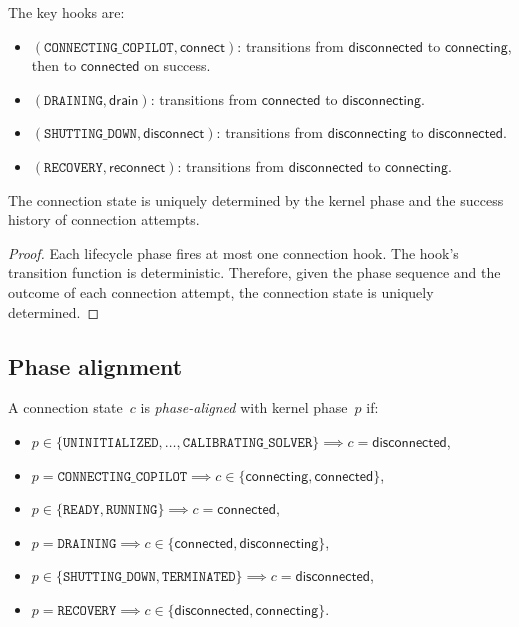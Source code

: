 \documentclass[11pt]{article}
\begin{document}
The key hooks are:
\begin{itemize}
\item $(\texttt{CONNECTING\_COPILOT}, \mathsf{connect})$:
      transitions from $\mathsf{disconnected}$ to
      $\mathsf{connecting}$, then to $\mathsf{connected}$
      on success.
\item $(\texttt{DRAINING}, \mathsf{drain})$: transitions from
      $\mathsf{connected}$ to $\mathsf{disconnecting}$.
\item $(\texttt{SHUTTING\_DOWN}, \mathsf{disconnect})$:
      transitions from $\mathsf{disconnecting}$ to
      $\mathsf{disconnected}$.
\item $(\texttt{RECOVERY}, \mathsf{reconnect})$: transitions
      from $\mathsf{disconnected}$ to $\mathsf{connecting}$.
\end{itemize}

\begin{lemma}\label{lem:conndet}
The connection state is uniquely determined by the kernel
phase and the success history of connection attempts.
\end{lemma}
\begin{proof}
Each lifecycle phase fires at most one connection hook.
The hook's transition function is deterministic.
Therefore, given the phase sequence and the outcome of
each connection attempt, the connection state is
uniquely determined.
\end{proof}

\subsection{Phase alignment}

\begin{definition}\label{def:phasealign}
A connection state~$c$ is \emph{phase-aligned} with
kernel phase~$p$ if:
\begin{itemize}
\item $p \in \{\texttt{UNINITIALIZED}, \ldots,
      \texttt{CALIBRATING\_SOLVER}\} \implies
      c = \mathsf{disconnected}$,
\item $p = \texttt{CONNECTING\_COPILOT} \implies
      c \in \{\mathsf{connecting}, \mathsf{connected}\}$,
\item $p \in \{\texttt{READY}, \texttt{RUNNING}\} \implies
      c = \mathsf{connected}$,
\item $p = \texttt{DRAINING} \implies
      c \in \{\mathsf{connected}, \mathsf{disconnecting}\}$,
\item $p \in \{\texttt{SHUTTING\_DOWN}, \texttt{TERMINATED}\}
      \implies c = \mathsf{disconnected}$,
\item $p = \texttt{RECOVERY} \implies
      c \in \{\mathsf{disconnected}, \mathsf{connecting}\}$.
\end{itemize}
\end{definition}
\end{document}
